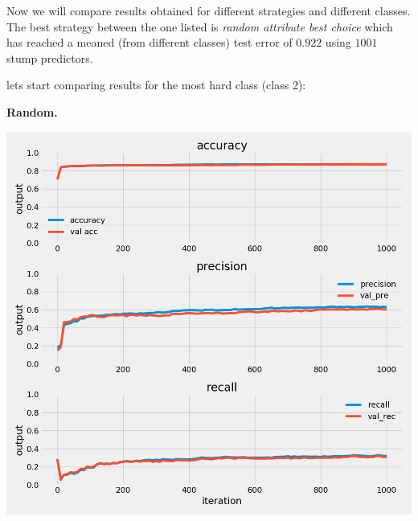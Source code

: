 \documentclass{article}
\begin{document}
Now we will compare results obtained for different strategies and different classes.
The best strategy between the one listed is \textit{random attribute best choice} which has 
reached a meaned (from different classes) test error of $0.922$ using $1001$ stump predictors.

\newpage
lets start comparing results for the most hard class (class 2):
\begin{multicols}{2}

	\begin{minipage}[t]{1\columnwidth}
	\begin{center}
	\textbf{Random.}\par\medskip
	\includegraphics[width=0.9\columnwidth]{../images/random_choice_class_2_cross_val_4.png}
	\label{random}
	\end{center}
	\end{minipage}


\end{multicols}
\end{document}
